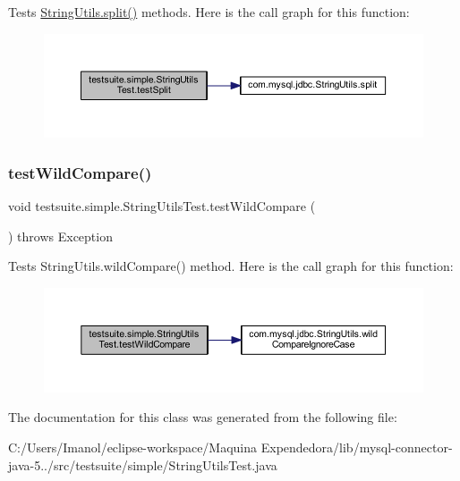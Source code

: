 Tests \mbox{\hyperlink{classcom_1_1mysql_1_1jdbc_1_1_string_utils_a9585acb209b381778e2d9ffde265e2f9}{String\+Utils.\+split()}} methods. Here is the call graph for this function\+:
\nopagebreak
\begin{figure}[H]
\begin{center}
\leavevmode
\includegraphics[width=350pt]{classtestsuite_1_1simple_1_1_string_utils_test_a535b80b532dc2f62828f79c5fec8605f_cgraph}
\end{center}
\end{figure}
\mbox{\label{classtestsuite_1_1simple_1_1_string_utils_test_a2c88f5e437abcdfdb41c193ff8eb2841}} 
\subsubsection{\texorpdfstring{test\+Wild\+Compare()}{testWildCompare()}}
{\footnotesize\ttfamily void testsuite.\+simple.\+String\+Utils\+Test.\+test\+Wild\+Compare (\begin{DoxyParamCaption}{ }\end{DoxyParamCaption}) throws Exception}

Tests String\+Utils.\+wild\+Compare() method. Here is the call graph for this function\+:
\nopagebreak
\begin{figure}[H]
\begin{center}
\leavevmode
\includegraphics[width=350pt]{classtestsuite_1_1simple_1_1_string_utils_test_a2c88f5e437abcdfdb41c193ff8eb2841_cgraph}
\end{center}
\end{figure}


The documentation for this class was generated from the following file\+:\begin{DoxyCompactItemize}
\item 
C\+:/\+Users/\+Imanol/eclipse-\/workspace/\+Maquina Expendedora/lib/mysql-\/connector-\/java-\/5../src/testsuite/simple/String\+Utils\+Test.\+java\end{DoxyCompactItemize}
